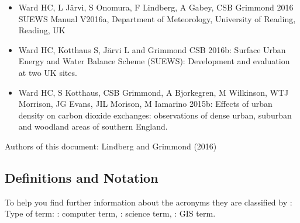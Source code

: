 \documentclass[letterpaper,10pt,english]{sphinxmanual}
\begin{document}
\begin{itemize}
\item {} 
Ward HC, L Järvi, S Onomura, F Lindberg, A Gabey, CSB Grimmond 2016
SUEWS Manual V2016a,  Department
of Meteorology, University of Reading, Reading, UK

\item {} 
Ward HC, Kotthaus S, Järvi L and Grimmond CSB 2016b: Surface Urban
Energy and Water Balance Scheme (SUEWS): Development and evaluation
at two UK sites. 

\item {} 
Ward HC, S Kotthaus, CSB Grimmond, A Bjorkegren, M Wilkinson, WTJ
Morrison, JG Evans, JIL Morison, M Iamarino 2015b: Effects of urban
density on carbon dioxide exchanges: observations of dense urban,
suburban and woodland areas of southern England. 

\end{itemize}

Authors of this document: Lindberg and Grimmond (2016)


\subsection{Definitions and Notation}
\label{\detokenize{Tutorials/SuewsAdvanced:definitions-and-notation}}
To help you find further information about the acronyms they are
classified by : Type of term: : computer term, : science
term, : GIS term.
\end{document}

